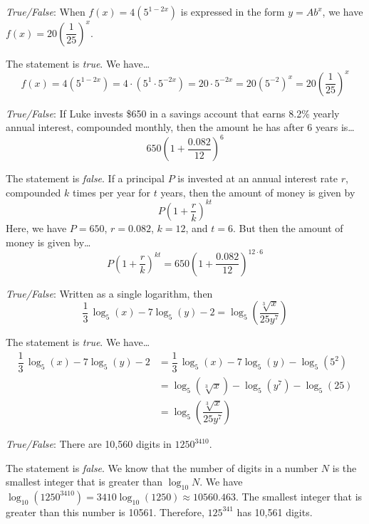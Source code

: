\documentclass[11pt,letterpaper]{article}
\begin{document}
\newpage



\quizsol \textit{True/False}: When $f(x)= 4(5^{1 - 2x})$ is expressed in the form $y= Ab^x$, we have $f(x)= 20 \left( \dfrac{1}{25} \right)^x$. \pspace

\sol The statement is \textit{true}. We have\dots
	\[
	f(x)= 4(5^{1 - 2x})= 4 \cdot (5^1 \cdot 5^{-2x})= 20 \cdot 5^{-2x}= 20 (5^{-2})^x= 20 \left( \dfrac{1}{25} \right)^x
	\] \pvspace{1.3cm}



\quizsol \textit{True/False}: If Luke invests \$650 in a savings account that earns 8.2\% yearly annual interest, compounded monthly, then the amount he has after 6 years is\dots
	\[
	650 \left( 1 + \dfrac{0.082}{12} \right)^6
	\]

\sol The statement is \textit{false}. If a principal $P$ is invested at an annual interest rate $r$, compounded $k$ times per year for $t$ years, then the amount of money is given by
	\[
	P \left(1 + \dfrac{r}{k} \right)^{kt}
	\]
Here, we have $P= 650$, $r= 0.082$, $k= 12$, and $t= 6$. But then the amount of money is given by\dots
	\[
	P \left(1 + \dfrac{r}{k} \right)^{kt}= 650 \left(1 + \dfrac{0.082}{12} \right)^{12 \cdot 6}
	\] \pvspace{1.3cm}



\quizsol \textit{True/False}: Written as a single logarithm, then
	\[
	\dfrac{1}{3}\, \log_5(x) - 7\log_5(y) - 2= \log_5 \left( \dfrac{\sqrt[3]{x}}{25y^7} \right)
	\]

\sol The statement is \textit{true}. We have\dots
	\[
	\begin{aligned}
	\dfrac{1}{3}\, \log_5(x) - 7\log_5(y) - 2&= \dfrac{1}{3}\, \log_5(x) - 7\log_5(y) - \log_5(5^2) \\
	&= \log_5(\sqrt[3]{x}) - \log_5(y^7) - \log_5(25) \\
	&= \log_5 \left( \dfrac{\sqrt[3]{x}}{25y^7} \right)
	\end{aligned}
	\] \vfill



\quizsol \textit{True/False}: There are 10,560 digits in $1250^{3410}$. \pspace

\sol The statement is \textit{false}. We know that the number of digits in a number $N$ is the smallest integer that is greater than $\log_{10} N$. We have $\log_{10}(1250^{3410})= 3410 \log_{10}(1250) \approx 10560.463$. The smallest integer that is greater than this number is 10561. Therefore, $125^{341}$ has 10,561 digits. 
\end{document}
